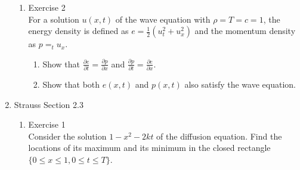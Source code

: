 \documentclass[12pt]{article}%
\begin{document}
\begin{enumerate}
\begin{enumerate}
        
        \item Exercise 2 \smallskip \\
        For a solution $u\left(x,t\right)$ of the wave equation with $\rho = T = c = 1$, the energy density is defined as $e = \frac{1}{2}\left(u_t^2 + u_x^2\right)$ and the momentum density as $p = _tu_x$.
        \begin{enumerate}
            \item Show that $\frac{\partial e}{\partial t} = \frac{\partial p}{\partial x}$ and $\frac{\partial p}{\partial t} = \frac{\partial e}{\partial x}$. \smallskip \\

            \item Show that both $e\left(x,t\right)$ and $p\left(x,t\right)$ also satisfy the wave equation. \smallskip \\
            
        \end{enumerate}
    \end{enumerate}
    \item Strauss Section 2.3 \smallskip
    \begin{enumerate}
        \item Exercise 1 \smallskip \\
        Consider the solution $1 - x^2 -2kt$ of the diffusion equation.  Find the locations of its maximum and its minimum in the closed rectangle $\{0 \leq x \leq 1, 0 \leq t \leq T\}$. \smallskip \\

        
    \end{enumerate}
\end{enumerate}
\end{document}
